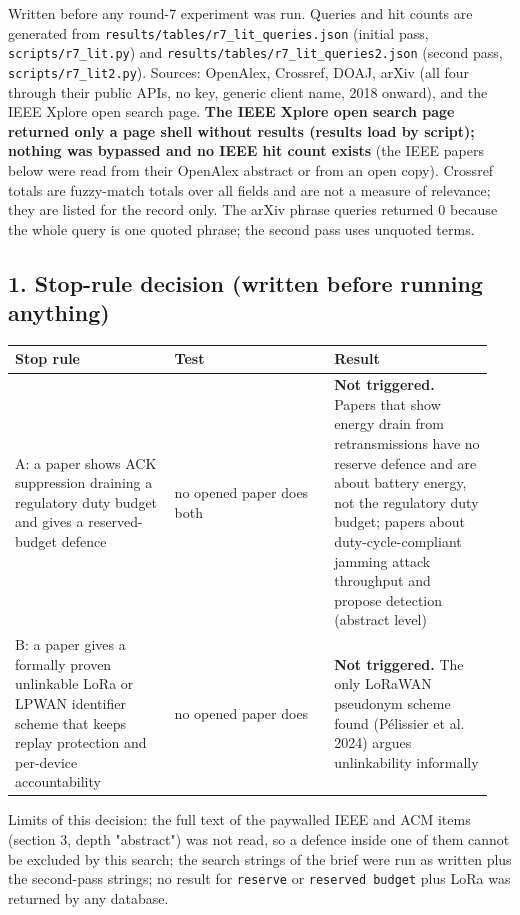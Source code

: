 


Written before any round-7 experiment was run. Queries and hit counts are generated from \texttt{results/tables/r7\_lit\_queries.json} (initial pass, \texttt{scripts/r7\_lit.py}) and \texttt{results/tables/r7\_lit\_queries2.json} (second pass, \texttt{scripts/r7\_lit2.py}). Sources: OpenAlex, Crossref, DOAJ, arXiv (all four through their public APIs, no key, generic client name, 2018 onward), and the IEEE Xplore open search page. \textbf{The IEEE Xplore open search page returned only a page shell without results (results load by script); nothing was bypassed and no IEEE hit count exists} (the IEEE papers below were read from their OpenAlex abstract or from an open copy). Crossref totals are fuzzy-match totals over all fields and are not a measure of relevance; they are listed for the record only. The arXiv phrase queries returned 0 because the whole query is one quoted phrase; the second pass uses unquoted terms.

\subsection*{1. Stop-rule decision (written before running anything)}

{\scriptsize\raggedright
\begin{longtable}{p{0.317\linewidth}p{0.317\linewidth}p{0.317\linewidth}}
\toprule
Stop rule & Test & Result \\
\midrule
\endhead
A: a paper shows ACK suppression draining a regulatory duty budget and gives a reserved-budget defence & no opened paper does both & \textbf{Not triggered.} Papers that show energy drain from retransmissions have no reserve defence and are about battery energy, not the regulatory duty budget; papers about duty-cycle-compliant jamming attack throughput and propose detection (abstract level) \\
B: a paper gives a formally proven unlinkable LoRa or LPWAN identifier scheme that keeps replay protection and per-device accountability & no opened paper does & \textbf{Not triggered.} The only LoRaWAN pseudonym scheme found (P\'elissier et al. 2024) argues unlinkability informally \\
\bottomrule
\end{longtable}}

Limits of this decision: the full text of the paywalled IEEE and ACM items (section 3, depth "abstract") was not read, so a defence inside one of them cannot be excluded by this search; the search strings of the brief were run as written plus the second-pass strings; no result for \texttt{reserve} or \texttt{reserved budget} plus LoRa was returned by any database.

